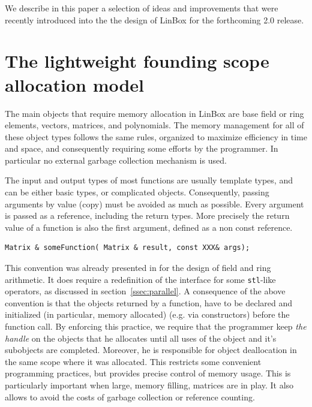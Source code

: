\documentclass[runningheads,a4paper]{llncs}
\newcommand{\linbox}{{\sc LinBox}\xspace}
\begin{document}
We describe in this paper a selection of ideas and
improvements that were recently introduced into the the design of LinBox 
for the forthcoming 2.0 release.

\section{The lightweight founding scope allocation model}

The main objects that require memory allocation in \linbox are base field or
ring elements, vectors, matrices, and polynomials.
The memory management for all of these object types follows the same rules, organized to
maximize efficiency in time and space, and consequently requiring some
efforts by  the programmer. In particular no external garbage collection
mechanism is used.

The input and output types of most functions are usually template
types, and can be either basic types, or complicated
objects. Consequently, passing arguments by value (copy) must be avoided as
much as possible. Every argument is passed as a reference, including
the return types. More precisely the return value of a function is
also the first argument, defined as a non const reference. 
\begin{verbatim}
Matrix & someFunction( Matrix & result, const XXX& args);
\end{verbatim}
This convention was already presented in \cite[\S 2.1]{jgd:2002:icms} for the
design of field and ring arithmetic. It does require a redefinition of the interface
for some \texttt{stl}-like operators, as discussed in
section~\ref{ssec:parallel}.
%
A consequence of the above convention is that the objects returned by
a function,
have to be declared and initialized (in particular, memory allocated) (e.g. via constructors) before the
function call.
By enforcing this
practice, we require that the programmer keep 
\textit{the handle} on the
objects that he allocates until all uses of the object and it's subobjects are completed. Moreover, he is responsible for object 
deallocation in the same 
scope where it was allocated. 
This restricts some convenient programming practices, but provides precise control of memory usage.
This is particularly important when large, memory filling, matrices
are in play.
It also allows to avoid the costs of garbage 
collection or reference counting.
\end{document}
